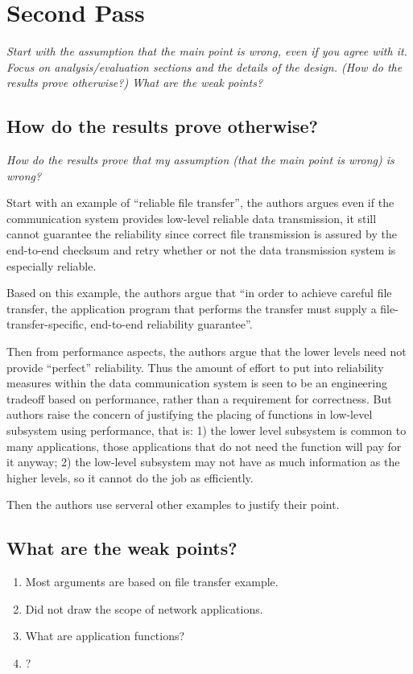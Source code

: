 \documentclass[11pt]{article}
\begin{document}
\section{Second Pass}

\emph{Start with the assumption that the main point is wrong, even if
  you agree with it. Focus on analysis/evaluation sections and the
  details of the design. (How do the results prove otherwise?) What
  are the weak points?}

\subsection{How do the results prove otherwise?}
\emph{How do the results prove that my assumption (that the main point
  is wrong) is wrong?}

Start with an example of ``reliable file transfer'', the authors argues
even if the communication system provides low-level reliable data
transmission, it still cannot guarantee the reliability since correct
file transmission is assured by the end-to-end checksum and retry
whether or not the data transmission system is especially reliable.

Based on this example, the authors argue that ``in order to achieve
careful file transfer, the application program that performs the
transfer must supply a file-transfer-specific, end-to-end reliability
guarantee''.

Then from performance aspects, the authors argue that the lower levels
need not provide ``perfect'' reliability. Thus the amount of effort to
put into reliability measures within the data communication system is
seen to be an engineering tradeoff based on performance, rather than a
requirement for correctness. But authors raise the concern of
justifying the placing of functions in low-level subsystem using
performance, that is: 1) the lower level subsystem is
common to many applications, those applications that do not need the
function will pay for it anyway; 2) the low-level subsystem may not
have as much information as the higher levels, so it cannot do the job
as efficiently.

Then the authors use serveral other examples to justify their point.

\subsection{What are the weak points?}
\begin{enumerate}
\item Most arguments are based on file transfer example.
\item Did not draw the scope of network applications.
\item What are application functions?
\item ?
\end{enumerate}
\end{document}
